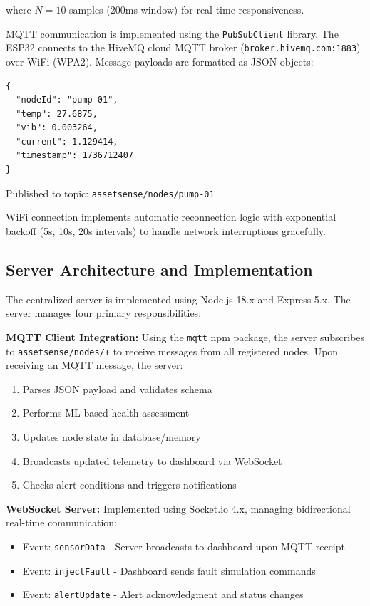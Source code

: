 \documentclass[conference]{IEEEtran}
\begin{document}
where $N=10$ samples (200ms window) for real-time responsiveness.

MQTT communication is implemented using the \texttt{PubSubClient} library. The ESP32 connects to the HiveMQ cloud MQTT broker (\texttt{broker.hivemq.com:1883}) over WiFi (WPA2). Message payloads are formatted as JSON objects:

\begin{verbatim}
{
  "nodeId": "pump-01",
  "temp": 27.6875,
  "vib": 0.003264,
  "current": 1.129414,
  "timestamp": 1736712407
}
\end{verbatim}

Published to topic: \texttt{assetsense/nodes/pump-01}

WiFi connection implements automatic reconnection logic with exponential backoff (5s, 10s, 20s intervals) to handle network interruptions gracefully.

\subsection{Server Architecture and Implementation}

The centralized server is implemented using Node.js 18.x and Express 5.x. The server manages four primary responsibilities:

\textbf{MQTT Client Integration:} Using the \texttt{mqtt} npm package, the server subscribes to \texttt{assetsense/nodes/+} to receive messages from all registered nodes. Upon receiving an MQTT message, the server:
\begin{enumerate}
\item Parses JSON payload and validates schema
\item Performs ML-based health assessment
\item Updates node state in database/memory
\item Broadcasts updated telemetry to dashboard via WebSocket
\item Checks alert conditions and triggers notifications
\end{enumerate}

\textbf{WebSocket Server:} Implemented using Socket.io 4.x, managing bidirectional real-time communication:
\begin{itemize}
\item Event: \texttt{sensorData} - Server broadcasts to dashboard upon MQTT receipt
\item Event: \texttt{injectFault} - Dashboard sends fault simulation commands
\item Event: \texttt{alertUpdate} - Alert acknowledgment and status changes
\end{itemize}
\end{document}
